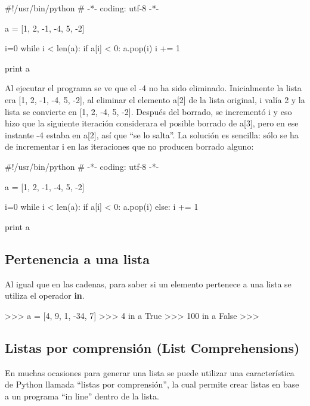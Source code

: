 \begin{pyglist} [language=python]
#!/usr/bin/python
# -*- coding: utf-8 -*-

a = [1, 2, -1, -4, 5, -2]

i=0
while i < len(a):
    if a[i] < 0:
        a.pop(i)
    i += 1

print a
\end{pyglist}

Al ejecutar el programa se ve que el -4 no ha sido eliminado. Inicialmente la lista era [1, 2, -1, -4, 5, -2], al eliminar el elemento a[2] de la lista original, i valía 2 y la lista se convierte en  [1, 2, -4, 5, -2]. Después del borrado, se incrementó i y eso hizo que la siguiente iteración considerara el posible borrado de a[3], pero en ese instante -4 estaba en a[2], así que ``se lo salta''. La solución es sencilla: sólo se ha de incrementar i en las iteraciones que no producen borrado alguno:\\

\begin{pyglist} [language=python]
#!/usr/bin/python
# -*- coding: utf-8 -*-

a = [1, 2, -1, -4, 5, -2]

i=0
while i < len(a):
    if a[i] < 0:
        a.pop(i)
    else:
        i += 1
        
print a
\end{pyglist}

\subsection{Pertenencia a una lista}

Al igual que en las cadenas, para saber si un elemento pertenece a una lista se utiliza el operador \textbf{in}. 

\begin{pyglist} [language=python]
>>> a = [4, 9, 1, -34, 7]
>>> 4 in a
True
>>> 100 in a
False
>>>
\end{pyglist}

\subsection{Listas por comprensión (List Comprehensions)}

En muchas ocasiones para generar una lista se puede utilizar una característica de Python llamada ``listas por comprensión'', la cual permite crear listas en base a un programa ``in line'' dentro de la lista.\\

